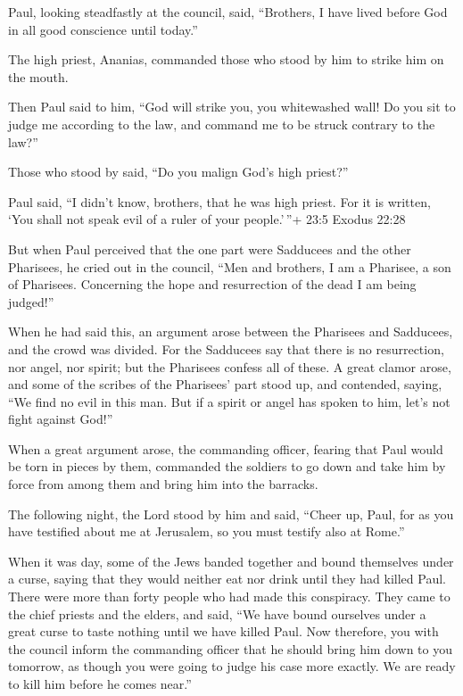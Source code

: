  Paul, looking steadfastly at the council, said, ``Brothers,
I have lived before God in all good conscience until today.''

 The high priest, Ananias, commanded those who stood by him
to strike him on the mouth.

 Then Paul said to him, ``God will strike you, you
whitewashed wall! Do you sit to judge me according to the law, and
command me to be struck contrary to the law?''

 Those who stood by said, ``Do you malign God's high
priest?''

 Paul said, ``I didn't know, brothers, that he was high
priest. For it is written, `You shall not speak evil of a ruler of your
people.'\,''+ 23:5 Exodus 22:28

 But when Paul perceived that the one part were Sadducees
and the other Pharisees, he cried out in the council, ``Men and
brothers, I am a Pharisee, a son of Pharisees. Concerning the hope and
resurrection of the dead I am being judged!''

 When he had said this, an argument arose between the
Pharisees and Sadducees, and the crowd was divided.  For the
Sadducees say that there is no resurrection, nor angel, nor spirit; but
the Pharisees confess all of these.  A great clamor arose,
and some of the scribes of the Pharisees' part stood up, and contended,
saying, ``We find no evil in this man. But if a spirit or angel has
spoken to him, let's not fight against God!''

 When a great argument arose, the commanding officer,
fearing that Paul would be torn in pieces by them, commanded the
soldiers to go down and take him by force from among them and bring him
into the barracks.

 The following night, the Lord stood by him and said,
``Cheer up, Paul, for as you have testified about me at Jerusalem, so
you must testify also at Rome.''

 When it was day, some of the Jews banded together and
bound themselves under a curse, saying that they would neither eat nor
drink until they had killed Paul.  There were more than
forty people who had made this conspiracy.  They came to
the chief priests and the elders, and said, ``We have bound ourselves
under a great curse to taste nothing until we have killed Paul.
 Now therefore, you with the council inform the commanding
officer that he should bring him down to you tomorrow, as though you
were going to judge his case more exactly. We are ready to kill him
before he comes near.''

